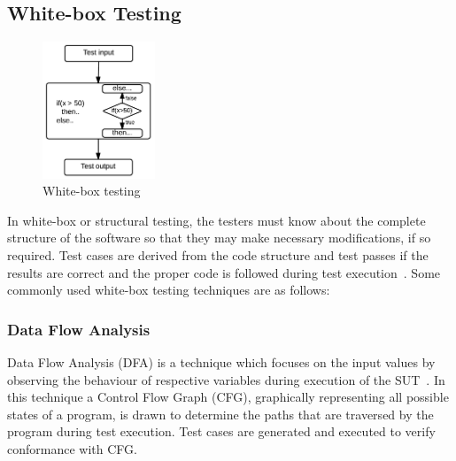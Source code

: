 \subsection{White-box Testing}
\begin{figure}
  \vspace{-35pt}
  \begin{center}
   \includegraphics[width=0.30\textwidth]{chapter2/whiteBox.png}
  \end{center}
  \vspace{-20pt}
  \bigskip
  \caption{White-box testing}
 \vspace{-18pt}
\end{figure}
In white-box or structural testing, the testers must know about the complete structure of the software so that they may make necessary modifications, if so required. Test cases are derived from the code structure and test passes if the results are correct and the proper code is followed during test execution~\cite{ostrand2002white}. Some commonly used white-box testing techniques are as follows:


\subsubsection{Data Flow Analysis}
Data Flow Analysis (DFA) is a technique which focuses on the input values by observing the behaviour of respective variables during execution of the SUT~\cite{clarke1989formal}. In this technique a Control Flow Graph (CFG), graphically representing all possible states of a program, is drawn to determine the paths that are traversed by the program during test execution. Test cases are generated and executed to verify conformance with CFG. 

